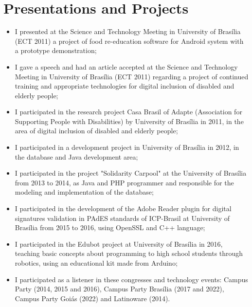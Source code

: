 \section{Presentations and Projects}

\begin{itemize}
    \item I presented at the Science and Technology Meeting in University of Brasília (ECT 2011) a project of food re-education software for Android system with a prototype demonstration;
    \item I gave a speech and had an article accepted at the Science and Technology Meeting in University of Brasília (ECT 2011) regarding a project of continued training and appropriate technologies for digital inclusion of disabled and elderly people; 
    \item I participated in the research project Casa Brasil of Adapte (Association for Supporting People with Disabilities) by University of Brasília in 2011, in the area of digital inclusion of disabled and elderly people;
    \item I participated in a development project in University of Brasília in 2012, in the database and Java development area;
    \item I participated in the project "Solidarity Carpool" at the University of Brasília from 2013 to 2014, as Java and PHP programmer and responsible for the modeling and implementation of the database;
    \item I participated in the development of the Adobe Reader plugin for digital signatures validation in PAdES standards of ICP-Brasil at University of Brasília from 2015 to 2016, using OpenSSL and C++ language;
    \item I participated in the Edubot project at University of Brasília in 2016, teaching basic concepts about programming to high school students through robotics, using an educational kit made from Arduino;
    \item I participated as a listener in these congresses and technology events: Campus Party (2014, 2015 and 2016), Campus Party Brasília (2017 and 2022), Campus Party Goiás (2022) and Latinoware (2014).
\end{itemize}